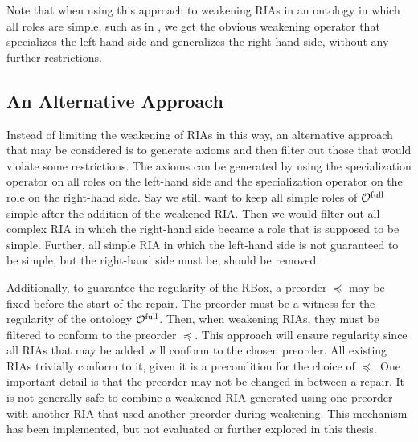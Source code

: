 Note that when using this approach to weakening RIAs in an ontology in which all roles are simple, such as in \ALCH, we get the obvious weakening operator that specializes the left-hand side and generalizes the right-hand side, without any further restrictions.

\subsection{An Alternative Approach}\label{rbox-alternative}

Instead of limiting the weakening of RIAs in this way, an alternative approach that may be considered is to generate axioms and then filter out those that would violate some restrictions. The axioms can be generated by using the specialization operator on all roles on the left-hand side and the specialization operator on the role on the right-hand side. Say we still want to keep all simple roles of ${\mathcal{O}^\textnormal{full}}$ simple after the addition of the weakened RIA. Then we would filter out all complex RIA in which the right-hand side became a role that is supposed to be simple. Further, all simple RIA in which the left-hand side is not guaranteed to be simple, but the right-hand side must be, should be removed.

Additionally, to guarantee the regularity of the RBox, a preorder $\preceq$ may be fixed before the start of the repair. The preorder must be a witness for the regularity of the ontology ${\mathcal{O}^\textnormal{full}}$. Then, when weakening RIAs, they must be filtered to conform to the preorder $\preceq$. This approach will ensure regularity since all RIAs that may be added will conform to the chosen preorder. All existing RIAs trivially conform to it, given it is a precondition for the choice of $\preceq$. One important detail is that the preorder may not be changed in between a repair. It is not generally safe to combine a weakened RIA generated using one preorder with another RIA that used another preorder during weakening. This mechanism has been implemented, but not evaluated or further explored in this thesis.

